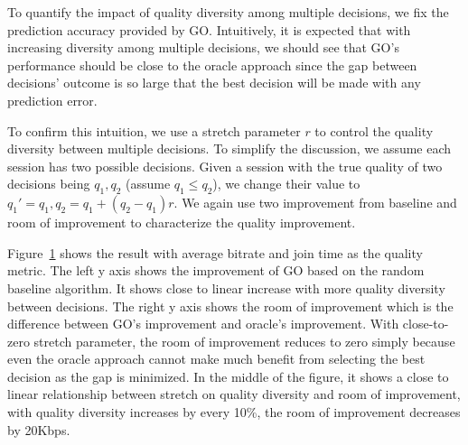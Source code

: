 \label{subsec:impact-diversity}

To quantify the impact of quality diversity among multiple decisions, we fix the prediction accuracy provided by GO. Intuitively, it is expected that with increasing diversity among multiple decisions, we should see that GO's performance should be close to the oracle approach since the gap between decisions' outcome is so large that the best decision will be made with any prediction error. 

To confirm this intuition, we use a stretch parameter $r$ to control the quality diversity between multiple decisions. To simplify the discussion, we assume each session has two possible decisions. Given a session with the true quality of two decisions being $q_1, q_2$ (assume $q_1\leq q_2$), we change their value to $q_1'=q_1, q_2=q_1+(q_2-q_1)r$. We again use two improvement from baseline and room of improvement to characterize the quality improvement.

\begin{figure}[h!]
\centering
{}
\hspace{-0.6cm}
\label{fig:trace-diversity}
\end{figure}

Figure~\ref{fig:trace-diversity} shows the result with average bitrate and join time as the quality metric. The left y axis shows the improvement of GO based on the random baseline algorithm. It shows close to linear increase with more quality diversity between decisions. 
The right y axis shows the room of improvement which is the difference between GO's improvement and oracle's improvement. With close-to-zero stretch parameter, the room of improvement reduces to zero simply because even the oracle approach cannot make much benefit from selecting the best decision as the gap is minimized. 
In the middle of the figure, it shows a close to linear relationship between stretch on quality diversity and room of improvement, with quality diversity increases by every 10\%, the room of improvement decreases by 20Kbps. 



